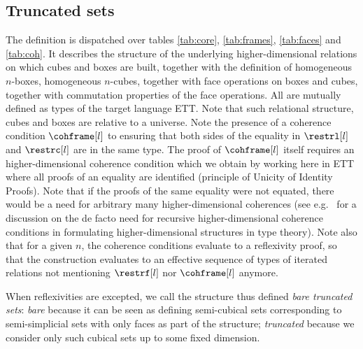 \documentclass[10pt]{art}
\newcommand{\U}[1]{\ensuremath{\mathsf{U}_{#1}}}
\newcommand{\unittype}{\ensuremath{\mathsf{unit}}}
\newcommand{\defeq}{\ensuremath{\triangleq}}
\newcommand{\X}[2]{\ensuremath{\mathsf{X}_{#1}^{<#2}}}
\newcommand{\Xcomp}[2]{\ensuremath{\mathsf{X}_{#1}^{=#2}}}
\newcommand{\fullframe}[2]{\ensuremath{\mathsf{fullframe}_{#1}^{#2}}}
\newcommand{\imp}{\ensuremath{\rightarrow}}
\renewcommand{\D}{\ensuremath{(D)}}
\newcommand{\eqnline}[4]{$#1$ & $#2$ & $#3$ & $#4$ \\}
\newcommand{\mc}[1]{\multicolumn{4}{c}{\textit{#1}} \\\\}
\begin{document}
\subsection{Truncated sets}
The definition is dispatched over tables \ref{tab:core}, \ref{tab:frames}, \ref{tab:faces} and \ref{tab:coh}. It describes the structure of the underlying higher-dimensional relations on which cubes and boxes are built, together with the definition of homogeneous $n$-boxes, homogeneous $n$-cubes, together with face operations on boxes and cubes, together with commutation properties of the face operations. All are mutually defined as types of the target language ETT. Note that such relational structure, cubes and boxes are relative to a universe. Note the presence of a coherence condition $\cohframe[l]$ to ensuring that both sides of the equality in $\restrl[l]$ and $\restrc[l]$ are in the same type. The proof of $\cohframe[l]$ itself requires an higher-dimensional coherence condition which we obtain by working here in ETT where all proofs of an equality are identified (principle of Unicity of Identity Proofs). Note that if the proofs of the same equality were not equated, there would be a need for arbitrary many higher-dimensional coherences (see e.g.~\cite{Herbelin15} for a discussion on the de facto need for recursive higher-dimensional coherence conditions in formulating higher-dimensional structures in type theory). Note also that for a given $n$, the coherence conditions evaluate to a reflexivity proof, so that the construction evaluates to an effective sequence of types of iterated relations not mentioning $\restrf[l]$ nor $\cohframe[l]$ anymore.

When reflexivities are excepted, we call the structure thus defined \emph{bare truncated sets}: \emph{bare} because it can be seen as defining semi-cubical sets corresponding to semi-simplicial sets with only faces as part of the structure; \emph{truncated} because we consider only such cubical sets up to some fixed dimension.

\end{document}
